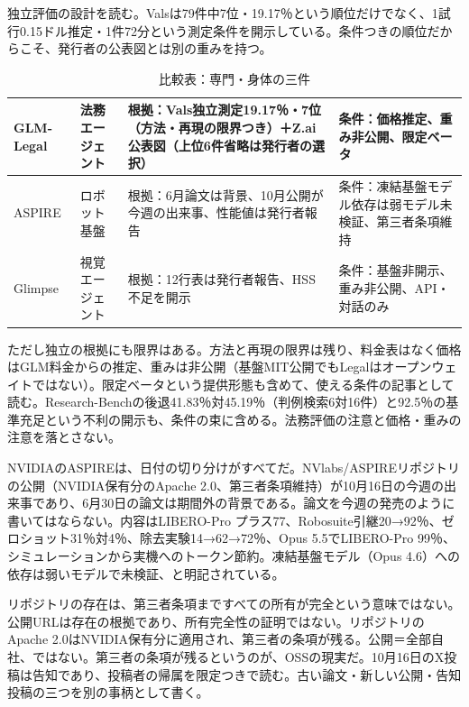 \documentclass[lualatex,a4paper,10pt]{jlreq}
\begin{document}
独立評価の設計を読む。Valsは79件中7位・19.17％という順位だけでなく、1試行0.15ドル推定・1件72分という測定条件を開示している。条件つきの順位だからこそ、発行者の公表図とは別の重みを持つ。
\cite{B53,B54,B55}


\begin{table}[htbp]\centering\footnotesize
\caption{比較表：専門・身体の三件}
\begin{tabularx}{0.96\linewidth}{@{}lXXX@{}}
\toprule
GLM-Legal & 法務エージェント & 根拠：Vals独立測定19.17％・7位（方法・再現の限界つき）＋Z.ai公表図（上位6件省略は発行者の選択） & 条件：価格推定、重み非公開、限定ベータ \cite{B55,B54,B53} \\
\midrule
ASPIRE & ロボット基盤 & 根拠：6月論文は背景、10月公開が今週の出来事、性能値は発行者報告 & 条件：凍結基盤モデル依存は弱モデル未検証、第三者条項維持 \cite{B57,B56} \\
\midrule
Glimpse & 視覚エージェント & 根拠：12行表は発行者報告、HSS不足を開示 & 条件：基盤非開示、重み非公開、API・対話のみ \cite{B58,B59} \\
\bottomrule
\end{tabularx}
\end{table}

ただし独立の根拠にも限界はある。方法と再現の限界は残り、料金表はなく価格はGLM料金からの推定、重みは非公開（基盤MIT公開でもLegalはオープンウェイトではない）。限定ベータという提供形態も含めて、使える条件の記事として読む。Research-Benchの後退41.83％対45.19％（判例検索6対16件）と92.5％の基準充足という不利の開示も、条件の束に含める。法務評価の注意と価格・重みの注意を落とさない。
\cite{B53,B54,B55}


NVIDIAのASPIREは、日付の切り分けがすべてだ。NVlabs/ASPIREリポジトリの公開（NVIDIA保有分のApache 2.0、第三者条項維持）が10月16日の今週の出来事であり、6月30日の論文は期間外の背景である。論文を今週の発売のように書いてはならない。内容はLIBERO-Pro プラス77、Robosuite引継20→92％、ゼロショット31％対4％、除去実験14→62→72％、Opus 5.5でLIBERO-Pro 99％、シミュレーションから実機へのトークン節約。凍結基盤モデル（Opus 4.6）への依存は弱いモデルで未検証、と明記されている。
\cite{B56,B57}


リポジトリの存在は、第三者条項まですべての所有が完全という意味ではない。公開URLは存在の根拠であり、所有完全性の証明ではない。リポジトリのApache 2.0はNVIDIA保有分に適用され、第三者の条項が残る。公開＝全部自社、ではない。第三者の条項が残るというのが、OSSの現実だ。10月16日のX投稿は告知であり、投稿者の帰属を限定つきで読む。古い論文・新しい公開・告知投稿の三つを別の事柄として書く。
\cite{B56,B57}
\end{document}
